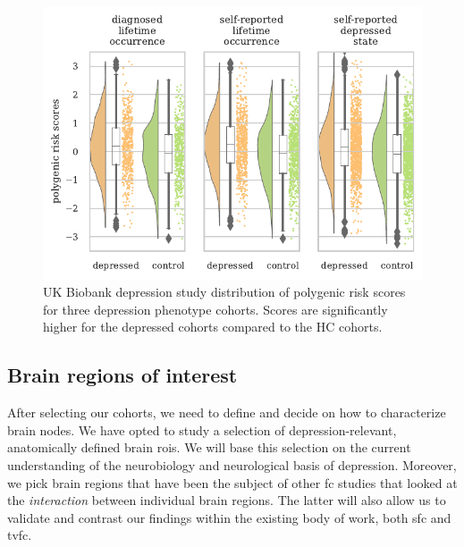 \begin{figure}[t]
  \centering
  \includegraphics[width=\textwidth]{fig/ukbiobank/PRS_all_analyses_per_cohort_joint}
  \caption{
    UK Biobank depression study distribution of polygenic risk scores for three depression phenotype cohorts.
    Scores are significantly higher for the depressed cohorts compared to the HC cohorts.
  }\label{fig:ukb-lifetime-occurrence-pgs}
\end{figure}


\subsection{Brain regions of interest}

After selecting our cohorts, we need to define and decide on how to characterize brain nodes.
We have opted to study a selection of depression-relevant, anatomically defined brain \glspl{roi}.
We will base this selection on the current understanding of the neurobiology and neurological basis of depression.
Moreover, we pick brain regions that have been the subject of other \gls{fc} studies that looked at the \emph{interaction} between individual brain regions.
The latter will also allow us to validate and contrast our findings within the existing body of work, both \gls{sfc} and \gls{tvfc}.

